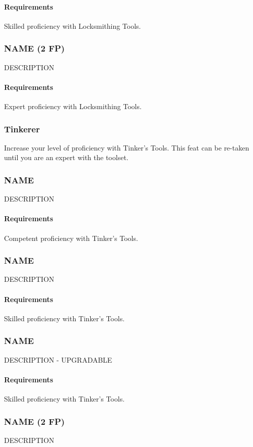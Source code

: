     \paragraph{Requirements} Skilled proficiency with Locksmithing Tools.
\subsubsection{NAME (2 FP)} \label{feat::name}
    DESCRIPTION
    \paragraph{Requirements} Expert proficiency with Locksmithing Tools.
\subsubsection{Tinkerer} \label{feat::tinkerer}
    Increase your level of proficiency with Tinker's Tools.
    This feat can be re-taken until you are an expert with the toolset.
\subsubsection{NAME} \label{feat::name}
    DESCRIPTION
    \paragraph{Requirements} Competent proficiency with Tinker's Tools.
\subsubsection{NAME} \label{feat::name}
    DESCRIPTION
    \paragraph{Requirements} Skilled proficiency with Tinker's Tools.
\subsubsection{NAME} \label{feat::name}
    DESCRIPTION - UPGRADABLE
    \paragraph{Requirements} Skilled proficiency with Tinker's Tools.
\subsubsection{NAME (2 FP)} \label{feat::name}
    DESCRIPTION

